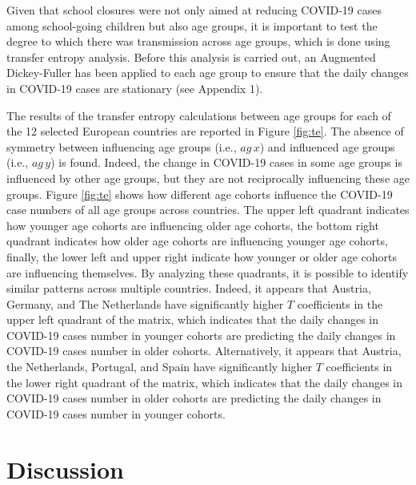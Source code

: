 \documentclass[]{interact}
\theoremstyle{plain}%
\theoremstyle{definition}
\theoremstyle{remark}
\begin{document}
Given that school closures were not only aimed at reducing COVID-19 cases among school-going children but also age groups, it is important to test the degree to which there was transmission across age groups, which is done using transfer entropy analysis. Before this analysis is carried out, an Augmented Dickey-Fuller has been applied to each age group to ensure that the daily changes in COVID-19 cases are stationary (see Appendix 1).

The results of the transfer entropy calculations between age groups for each of the 12 selected European countries are reported in Figure \ref{fig:te}. The absence of symmetry between influencing age groups (i.e., \(ag\,x\)) and influenced age groups (i.e., \(ag\,y\)) is found. Indeed, the change in COVID-19 cases in some age groups is influenced by other age groups, but they are not reciprocally influencing these age groups. Figure \ref{fig:te} shows how different age cohorts influence the COVID-19 case numbers of all age groups across countries. The upper left quadrant indicates how younger age cohorts are influencing older age cohorts, the bottom right quadrant indicates how older age cohorts are influencing younger age cohorts, finally, the lower left and upper right indicate how younger or older age cohorts are influencing themselves. By analyzing these quadrants, it is possible to identify similar patterns across multiple countries. Indeed, it appears that Austria, Germany, and The Netherlands have significantly higher \(T\) coefficients in the upper left quadrant of the matrix, which indicates that the daily changes in COVID-19 cases number in younger cohorts are predicting the daily changes in COVID-19 cases number in older cohorts. Alternatively, it appears that Austria, the Netherlands, Portugal, and Spain have significantly higher \(T\) coefficients in the lower right quadrant of the matrix, which indicates that the daily changes in COVID-19 cases number in older cohorts are predicting the daily changes in COVID-19 cases number in younger cohorts.

\section{Discussion}\label{discussion}
\end{document}
